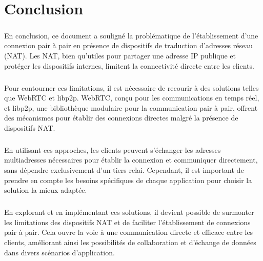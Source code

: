 \chapter{Conclusion}

\paragraph{}
En conclusion, ce document a souligné la problématique de l'établissement d'une connexion pair à pair en présence de dispositifs de traduction d'adresses réseau (NAT). Les NAT, bien qu'utiles pour partager une adresse IP publique et protéger 
les dispositifs internes, limitent la connectivité directe entre les clients.

\paragraph{}
Pour contourner ces limitations, il est nécessaire de recourir à des solutions telles que WebRTC et libp2p. WebRTC, conçu pour les communications en temps réel, et libp2p, une bibliothèque modulaire pour la communication pair à pair, 
offrent des mécanismes pour établir des connexions directes malgré la présence de dispositifs NAT.

\paragraph{}
En utilisant ces approches, les clients peuvent s'échanger les adresses multiadresses nécessaires pour établir la connexion et communiquer directement, sans dépendre exclusivement d'un tiers relai. Cependant, il est important de prendre
 en compte les besoins spécifiques de chaque application pour choisir la solution la mieux adaptée.

\paragraph{}
En explorant et en implémentant ces solutions, il devient possible de surmonter les limitations des dispositifs NAT et de faciliter l'établissement de connexions pair à pair. Cela ouvre la voie à une communication directe et efficace entre les clients, 
améliorant ainsi les possibilités de collaboration et d'échange de données dans divers scénarios d'application.